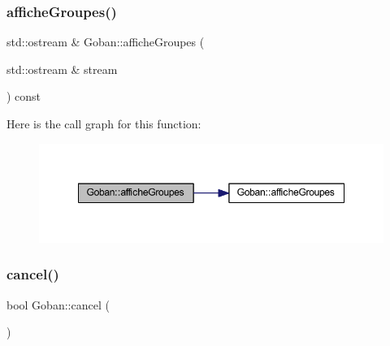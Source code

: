 \subsubsection{\texorpdfstring{affiche\+Groupes()}{afficheGroupes()}\hspace{0.1cm}{\footnotesize\ttfamily [2/2]}}
{\footnotesize\ttfamily std\+::ostream \& Goban\+::affiche\+Groupes (\begin{DoxyParamCaption}\item[{std\+::ostream \&}]{stream }\end{DoxyParamCaption}) const}

Here is the call graph for this function\+:\nopagebreak
\begin{figure}[H]
\begin{center}
\leavevmode
\includegraphics[width=348pt]{class_goban_a8d5df6cd74b0240f36a4056f045625b7_cgraph}
\end{center}
\end{figure}
\mbox{\label{class_goban_ae7ee3b39f3c0d28c9bca286ca538f8ac}} 
\subsubsection{\texorpdfstring{cancel()}{cancel()}}
{\footnotesize\ttfamily bool Goban\+::cancel (\begin{DoxyParamCaption}{ }\end{DoxyParamCaption})}

